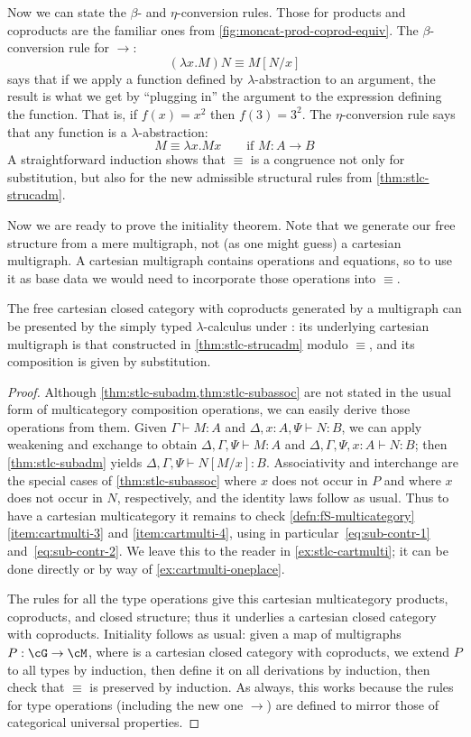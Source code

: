 \documentclass{book}
\let\types\vdash
\begin{document}
Now we can state the $\beta$- and $\eta$-conversion rules.
Those for products and coproducts are the familiar ones from \cref{fig:moncat-prod-coprod-equiv}.
The $\beta$-conversion rule for $\to$:
\[ (\lambda x.M)N \equiv M[N/x]\]
says that if we apply a function defined by $\lambda$-abstraction to an argument, the result is what we get by ``plugging in'' the argument to the expression defining the function.
That is, if $f(x)=x^2$ then $f(3) = 3^2$.
The $\eta$-conversion rule says that any function is a $\lambda$-abstraction:
\[  M \equiv \lambda x.Mx \qquad \text{if } M:A\to B\]
A straightforward induction shows that $\equiv$ is a congruence not only for substitution, but also for the new admissible structural rules from \cref{thm:stlc-strucadm}.

Now we are ready to prove the initiality theorem.
Note that we generate our free structure from a mere multigraph, not (as one might guess) a cartesian multigraph.
A cartesian multigraph contains operations and equations, so to use it as base data we would need to incorporate those operations into $\equiv$.

\begin{thm}\label{thm:stlc-initial}
  The free cartesian closed category with coproducts generated by a multigraph \cG can be presented by the simply typed $\lambda$-calculus under \cG: its underlying cartesian multigraph is that constructed in \cref{thm:stlc-strucadm} modulo $\equiv$, and its composition is given by substitution.
\end{thm}
\begin{proof}
  Although \cref{thm:stlc-subadm,thm:stlc-subassoc} are not stated in the usual form of multicategory composition operations, we can easily derive those operations from them.
  Given $\Gamma\types M:A$ and $\Delta,x:A,\Psi\types N:B$, we can apply weakening and exchange to obtain $\Delta,\Gamma,\Psi\types M:A$ and $\Delta,\Gamma,\Psi,x:A\types N:B$; then \cref{thm:stlc-subadm} yields $\Delta,\Gamma,\Psi\types N[M/x]:B$.
  Associativity and interchange are the special cases of \cref{thm:stlc-subassoc} where $x$ does not occur in $P$ and where $x$ does not occur in $N$, respectively, and the identity laws follow as usual.
  Thus to have a cartesian multicategory it remains to check \cref{defn:fS-multicategory}\ref{item:cartmulti-3} and \ref{item:cartmulti-4}, using in particular~\eqref{eq:sub-contr-1} and~\eqref{eq:sub-contr-2}.
  We leave this to the reader in \cref{ex:stlc-cartmulti}; it can be done directly or by way of \cref{ex:cartmulti-oneplace}.

  The rules for all the type operations give this cartesian multicategory products, coproducts, and closed structure; thus it underlies a cartesian closed category with coproducts.
  Initiality follows as usual: given a map of multigraphs $P:\cG\to \cM$, where \cM is a cartesian closed category with coproducts, we extend $P$ to all types by induction, then define it on all derivations by induction, then check that $\equiv$ is preserved by induction.
  As always, this works because the rules for type operations (including the new one $\to$) are defined to mirror those of categorical universal properties.
\end{proof}
\end{document}
